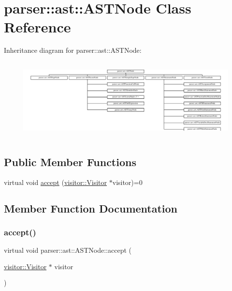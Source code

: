 \hypertarget{classparser_1_1ast_1_1ASTNode}{}\section{parser\+:\+:ast\+:\+:A\+S\+T\+Node Class Reference}
\label{classparser_1_1ast_1_1ASTNode}
Inheritance diagram for parser\+:\+:ast\+:\+:A\+S\+T\+Node\+:\begin{figure}[H]
\begin{center}
\leavevmode
\includegraphics[height=4.179105cm]{da/d7c/classparser_1_1ast_1_1ASTNode}
\end{center}
\end{figure}
\subsection*{Public Member Functions}
\begin{DoxyCompactItemize}
\item 
virtual void \hyperlink{classparser_1_1ast_1_1ASTNode_a3ff84fdfdbbc5c39b70b4d04c22e7dc3}{accept} (\hyperlink{classvisitor_1_1Visitor}{visitor\+::\+Visitor} $\ast$visitor)=0
\end{DoxyCompactItemize}


\subsection{Member Function Documentation}
\mbox{\label{classparser_1_1ast_1_1ASTNode_a3ff84fdfdbbc5c39b70b4d04c22e7dc3}} 
\subsubsection{\texorpdfstring{accept()}{accept()}}
{\footnotesize\ttfamily virtual void parser\+::ast\+::\+A\+S\+T\+Node\+::accept (\begin{DoxyParamCaption}\item[{\hyperlink{classvisitor_1_1Visitor}{visitor\+::\+Visitor} $\ast$}]{visitor }\end{DoxyParamCaption})\hspace{0.3cm}{\ttfamily [pure virtual]}}

